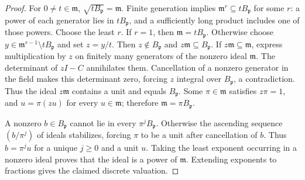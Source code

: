 \begin{proof}
For \(0\ne t\in\mathfrak m\),
\(\sqrt{tB_{\mathfrak p}}=\mathfrak m\). Finite generation implies
\(\mathfrak m^r\subseteq tB_{\mathfrak p}\) for some \(r\): a power
of each generator lies in \(tB_{\mathfrak p}\), and a sufficiently
long product includes one of those powers. Choose the least \(r\).
If \(r=1\), then \(\mathfrak m=tB_{\mathfrak p}\). Otherwise choose
\(y\in\mathfrak m^{r-1}\setminus tB_{\mathfrak p}\) and set \(z=y/t\).
Then \(z\notin B_{\mathfrak p}\) and \(z\mathfrak m\subseteq B_{\mathfrak p}\).
If \(z\mathfrak m\subseteq\mathfrak m\), express multiplication by
\(z\) on finitely many generators of the nonzero ideal \(\mathfrak m\).
The determinant of \(zI-C\) annihilates them. Cancellation of a
nonzero generator in the field makes this determinant zero, forcing
\(z\) integral over \(B_{\mathfrak p}\), a contradiction.
Thus the ideal \(z\mathfrak m\) contains a unit and equals
\(B_{\mathfrak p}\). Some \(\pi\in\mathfrak m\) satisfies \(z\pi=1\),
and \(u=\pi(zu)\) for every \(u\in\mathfrak m\); therefore
\(\mathfrak m=\pi B_{\mathfrak p}\).

A nonzero \(b\in B_{\mathfrak p}\) cannot lie in every
\(\pi^j B_{\mathfrak p}\). Otherwise the ascending sequence
\((b/\pi^j)\) of ideals stabilizes, forcing \(\pi\) to be a unit
after cancellation of \(b\). Thus \(b=\pi^j u\) for a unique
\(j\ge0\) and a unit \(u\). Taking the least exponent occurring in
a nonzero ideal proves that the ideal is a power of \(\mathfrak m\).
Extending exponents to fractions gives the claimed discrete valuation.
\end{proof}

